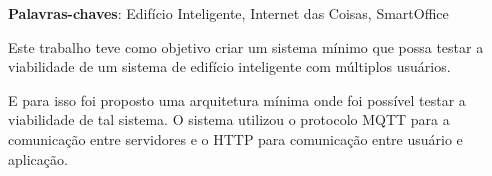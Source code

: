 \begin{resumo}

\vspace{\onelineskip}
\noindent
\textbf{Palavras-chaves}: Edifício Inteligente, Internet das Coisas, SmartOffice
\end{resumo}

Este trabalho teve como objetivo criar um sistema mínimo que possa testar
a viabilidade de um sistema de edifício inteligente com múltiplos usuários.

E para isso foi proposto uma arquitetura mínima onde foi possível testar a viabilidade de tal sistema.
O sistema utilizou o protocolo MQTT para a comunicação entre servidores e o HTTP para comunicação entre usuário e aplicação.